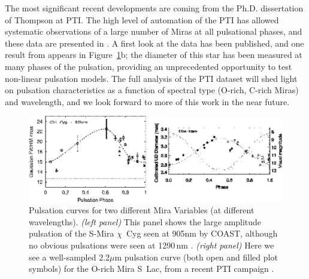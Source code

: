 \documentclass[12pt]{article}
\begin{document}
The most significant recent developments are coming from the Ph.D.
dissertation of Thompson at PTI.  The high level of automation of the
PTI has allowed systematic observations of a large number of Miras at
all pulsational phases, and these data are presented in
\citet{thompsonthesis}.  A first look at the data has been published,
and one result from \citet{thompson2002a} appears in
Figure~\ref{pulsations}b; the diameter of this star has been measured
at many phases of the pulsation, providing an unprecedented
opportunity to test non-linear pulsation models.  The full analysis of
the PTI dataset will shed light on pulsation characteristics as a
function of spectral type (O-rich, C-rich Miras) and wavelength, and
we look forward to more of this work in the near future.

\begin{figure}[tbhp]
\begin{center}
\includegraphics[clip,angle=0,width=5.0in]{Figures/JDM_pulsations.eps}
\caption{\footnotesize Pulsation curves for two different
  Mira Variables (at different wavelengths).  {\em (left panel)} This
  panel shows the large amplitude pulsation of the S-Mira $\chi$~Cyg
  seen at 905nm by COAST, although no obvious pulsations were seen at
  1290\,nm \citep[see Figure~2a in][reproduced here with permission of
  Blackwell Publishing]{young2000a}.  {\em (right panel)} Here we see
  a well-sampled 2.2$\mu$m pulsation curve (both open and filled
  plot symbols) for the O-rich Mira S~Lac, from a recent PTI campaign
  \citep[see Figure~2 in][reproduced with permission of the
  AAS]{thompson2002a}.
\label{pulsations}}
\end{center}
\end{figure}
\end{document}
